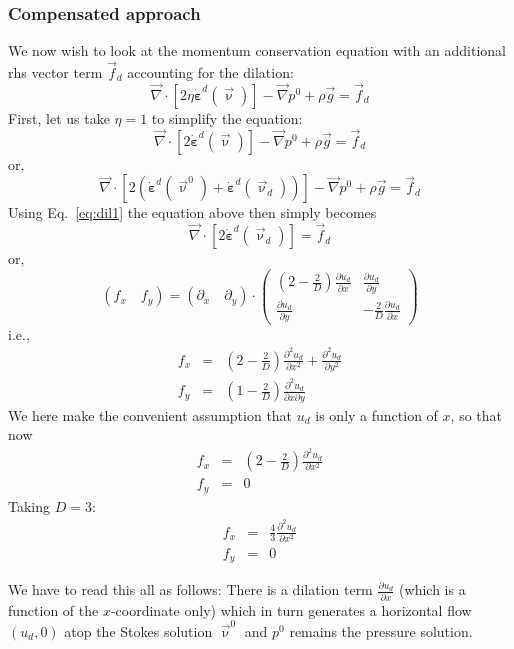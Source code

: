 \subsubsection*{Compensated approach}

We now wish to look at the momentum conservation equation with an additional rhs vector term 
$\vec{f}_d$ accounting for the dilation:
\[
\vec\nabla \cdot [2 \eta \dot{\bm \varepsilon}^d(\vec\upnu)]  -\vec\nabla p^0 + \rho \vec{g} = \vec{f}_d
\]
First, let us take $\eta=1$ to simplify the equation:
\[
\vec\nabla \cdot [2  \dot{\bm \varepsilon}^d(\vec\upnu)]  -\vec\nabla p^0 + \rho \vec{g} = \vec{f}_d
\]
or,
\[
\vec\nabla \cdot [2  (\dot{\bm \varepsilon}^d(\vec\upnu^0) +\dot{\bm \varepsilon}^d(\vec\upnu_d) ) ]  
-\vec\nabla p^0 + \rho \vec{g} = \vec{f}_d
\]
Using Eq.~\eqref{eq:dil1} the equation above then simply becomes
\begin{equation}
\vec\nabla \cdot [2  \dot{\bm \varepsilon}^d(\vec\upnu_d)  ]  = \vec{f}_d
\label{eq:dilation_rhs}
\end{equation}
or, 
\[
(f_x \quad f_y)
=
(\partial_x \quad \partial_y) \cdot \begin{pmatrix}
(2-\frac2D) \frac{\partial u_d}{\partial x} &  \frac{\partial u_d}{\partial y}  \\
 \frac{\partial u_d}{\partial y}  & -\frac2D \frac{\partial u_d}{\partial x}
\end{pmatrix}
\]
i.e., 
\begin{eqnarray}
f_x &=& \left(2-\frac2D\right) \frac{\partial^2 u_d}{\partial x^2}  +  \frac{\partial^2 u_d}{\partial y^2} \nonumber\\
f_y &=& \left(1-\frac2D\right) \frac{\partial^2 u_d}{\partial x \partial y}  \label{f175:fxfy}
\end{eqnarray}
We here make the convenient assumption that $u_d$ is only a function of $x$, so that now
\begin{eqnarray}
f_x &=& (2-\frac2D) \frac{\partial^2 u_d}{\partial x^2}   \nonumber\\
f_y &=& 0
\end{eqnarray}
Taking $D=3$:
\begin{eqnarray}
f_x &=& \frac43 \frac{\partial^2 u_d}{\partial x^2}   \nonumber\\
f_y &=& 0
\end{eqnarray}

We have to read this all as follows: There is a dilation term $\frac{\partial u_d}{\partial x}$ 
(which is a function of the $x$-coordinate only) which in turn generates a horizontal flow $(u_d,0)$
atop the Stokes solution $\vec\upnu^0$ and $p^0$ remains the pressure solution.

